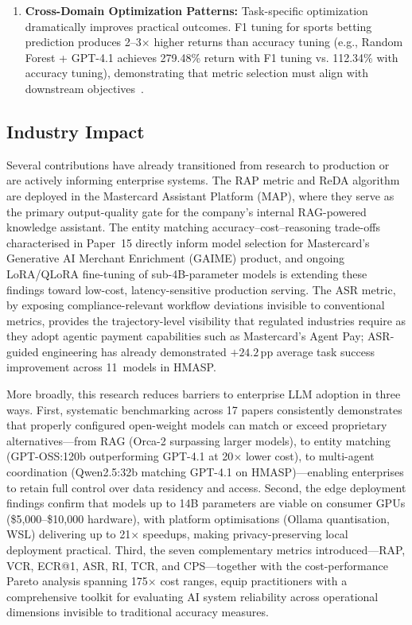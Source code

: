 \begin{enumerate}[leftmargin=*]
    \item \textbf{Cross-Domain Optimization Patterns:} Task-specific optimization dramatically improves practical outcomes. F1 tuning for sports betting prediction produces 2--3$\times$ higher returns than accuracy tuning (e.g., Random Forest + GPT-4.1 achieves 279.48\% return with F1 tuning vs. 112.34\% with accuracy tuning), demonstrating that metric selection must align with downstream objectives~\cite{samuel2025soccer}.
\end{enumerate}

\subsection{Industry Impact}

Several contributions have already transitioned from research to production or are actively informing enterprise systems.  The RAP metric and ReDA algorithm are deployed in the Mastercard Assistant Platform (MAP), where they serve as the primary output-quality gate for the company's internal RAG-powered knowledge assistant.  The entity matching accuracy--cost--reasoning trade-offs characterised in Paper~15 directly inform model selection for Mastercard's Generative AI Merchant Enrichment (GAIME) product, and ongoing LoRA/QLoRA fine-tuning of sub-4B-parameter models is extending these findings toward low-cost, latency-sensitive production serving.  The ASR metric, by exposing compliance-relevant workflow deviations invisible to conventional metrics, provides the trajectory-level visibility that regulated industries require as they adopt agentic payment capabilities such as Mastercard's Agent Pay; ASR-guided engineering has already demonstrated $+24.2$\,pp average task success improvement across 11~models in HMASP.

More broadly, this research reduces barriers to enterprise LLM adoption in three ways.  First, systematic benchmarking across 17 papers consistently demonstrates that properly configured open-weight models can match or exceed proprietary alternatives---from RAG (Orca-2 surpassing larger models), to entity matching (GPT-OSS:120b outperforming GPT-4.1 at 20$\times$ lower cost), to multi-agent coordination (Qwen2.5:32b matching GPT-4.1 on HMASP)---enabling enterprises to retain full control over data residency and access.  Second, the edge deployment findings confirm that models up to 14B parameters are viable on consumer GPUs (\$5{,}000--\$10{,}000 hardware), with platform optimisations (Ollama quantisation, WSL) delivering up to 21$\times$ speedups, making privacy-preserving local deployment practical.  Third, the seven complementary metrics introduced---RAP, VCR, ECR@1, ASR, RI, TCR, and CPS---together with the cost-performance Pareto analysis spanning 175$\times$ cost ranges, equip practitioners with a comprehensive toolkit for evaluating AI system reliability across operational dimensions invisible to traditional accuracy measures.

